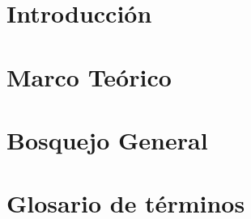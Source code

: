 \documentclass[10pt]{book}
\begin{document}



\chapter{Introducción}\label{chp:introduccion}

\chapter{Marco Teórico}\label{chp:marcoTeo}

\chapter{Bosquejo General}\label{chp:bosquejoGeneral}

\chapter{Glosario de términos}\label{chp:glosarioTerminos}

\end{document}
